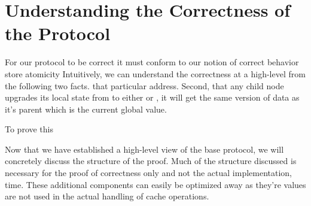 \section{Understanding the Correctness of the Protocol}
\label{Sec:ProofStructure}

For our protocol to be correct it must conform to our notion of
correct behavior \eg{} store atomicity Intuitively, we can understand
the correctness at a high-level from the following two facts.  that
particular address. Second, that any child node upgrades its local
state from \In to either \Sh or \Mo, it will get the same version of
data as it's parent which is the current global value.

To prove this







Now that we have established a high-level view of the base protocol,
we will concretely discuss the structure of the proof. Much of the
structure discussed is necessary for the proof of correctness only and
not the actual implementation, \eg{} time. These additional components
can easily be optimized away as they're values are not used in the
actual handling of cache operations.
